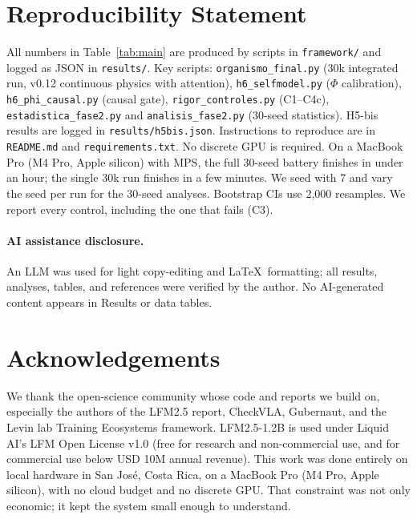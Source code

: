 \documentclass[11pt,a4paper]{article}
\begin{document}
\section{Reproducibility Statement}

All numbers in Table~\ref{tab:main} are produced by scripts in \texttt{framework/} and logged as JSON in \texttt{results/}. Key scripts: \texttt{organismo\_final.py} (30k integrated run, v0.12 continuous physics with attention), \texttt{h6\_selfmodel.py} ($\Phi$ calibration), \texttt{h6\_phi\_causal.py} (causal gate), \texttt{rigor\_controles.py} (C1--C4c), \texttt{estadistica\_fase2.py} and \texttt{analisis\_fase2.py} (30-seed statistics). H5-bis results are logged in \texttt{results/h5bis.json}. Instructions to reproduce are in \texttt{README.md} and \texttt{requirements.txt}. No discrete GPU is required. On a MacBook Pro (M4 Pro, Apple silicon) with MPS, the full 30-seed battery finishes in under an hour; the single 30k run finishes in a few minutes. We seed with 7 and vary the seed per run for the 30-seed analyses. Bootstrap CIs use 2,000 resamples. We report every control, including the one that fails (C3).

\paragraph{AI assistance disclosure.} An LLM was used for light copy-editing and \LaTeX\ formatting; all results, analyses, tables, and references were verified by the author. No AI-generated content appears in Results or data tables.

\section{Acknowledgements}

We thank the open-science community whose code and reports we build on, especially the authors of the LFM2.5 report, CheckVLA, Gubernaut, and the Levin lab Training Ecosystems framework. LFM2.5-1.2B is used under Liquid AI's LFM Open License v1.0 (free for research and non-commercial use, and for commercial use below USD 10M annual revenue). This work was done entirely on local hardware in San Jos\'e, Costa Rica, on a MacBook Pro (M4 Pro, Apple silicon), with no cloud budget and no discrete GPU. That constraint was not only economic; it kept the system small enough to understand.
\end{document}
